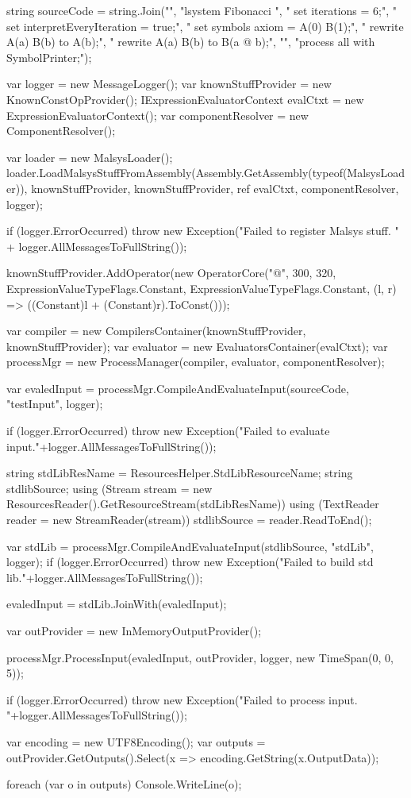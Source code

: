 \begin{CsharpBreak}[label=code:libUsageSrc,caption={Symbol filter component with documented members}]
string sourceCode = string.Join("\n",
	"lsystem Fibonacci {",
	"	set iterations = 6;",
	"	set interpretEveryIteration = true;",
	"	set symbols axiom = A(0) B(1);",
	"	rewrite          A(a) { B(b) } to A(b);",
	"	rewrite { A(a) } B(b)          to B(a @ b);",
	"}",
	"process all with SymbolPrinter;");

var logger = new MessageLogger();
var knownStuffProvider = new KnownConstOpProvider();
IExpressionEvaluatorContext evalCtxt = new ExpressionEvaluatorContext();
var componentResolver = new ComponentResolver();

var loader = new MalsysLoader();
loader.LoadMalsysStuffFromAssembly(Assembly.GetAssembly(typeof(MalsysLoader)),
	knownStuffProvider, knownStuffProvider, ref evalCtxt, componentResolver, logger);

if (logger.ErrorOccurred) {
	throw new Exception("Failed to register Malsys stuff. "
		+ logger.AllMessagesToFullString());
}

knownStuffProvider.AddOperator(new OperatorCore("@", 300, 320,
	ExpressionValueTypeFlags.Constant, ExpressionValueTypeFlags.Constant,
	(l, r) => ((Constant)l + (Constant)r).ToConst()));

var compiler = new CompilersContainer(knownStuffProvider, knownStuffProvider);
var evaluator = new EvaluatorsContainer(evalCtxt);
var processMgr = new ProcessManager(compiler, evaluator, componentResolver);


var evaledInput = processMgr.CompileAndEvaluateInput(sourceCode, "testInput", logger);

if (logger.ErrorOccurred) {
	throw new Exception("Failed to evaluate input."+logger.AllMessagesToFullString());
}

string stdLibResName = ResourcesHelper.StdLibResourceName;
string stdlibSource;
using (Stream stream = new ResourcesReader().GetResourceStream(stdLibResName)) {
	using (TextReader reader = new StreamReader(stream)) {
		stdlibSource = reader.ReadToEnd();
	}
}

var stdLib = processMgr.CompileAndEvaluateInput(stdlibSource, "stdLib", logger);
if (logger.ErrorOccurred) {
	throw new Exception("Failed to build std lib."+logger.AllMessagesToFullString());
}

evaledInput = stdLib.JoinWith(evaledInput);

var outProvider = new InMemoryOutputProvider();

processMgr.ProcessInput(evaledInput, outProvider, logger, new TimeSpan(0, 0, 5));

if (logger.ErrorOccurred) {
	throw new Exception("Failed to process input. "+logger.AllMessagesToFullString());
}

var encoding = new UTF8Encoding();
var outputs = outProvider.GetOutputs().Select(x => encoding.GetString(x.OutputData));

foreach (var o in outputs) {
	Console.WriteLine(o);
}
\end{CsharpBreak}
























